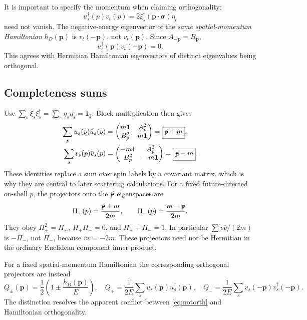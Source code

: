 \documentclass[11pt]{article}
\newcommand{\one}{\mathbf 1}
\begin{document}
It is important to specify the momentum when claiming orthogonality:
\begin{equation}
 u_s^\dagger(p)v_t(p)
    =2\xi_s^\dagger(\bm p\cdot\bm\sigma)\eta_t
 \label{eq:notorth}
\end{equation}
need not vanish. The negative-energy eigenvector of the
\emph{same spatial-momentum Hamiltonian} \(h_D(\bm p)\) is
\(v_t(-\bm p)\), not \(v_t(\bm p)\). Since
\(A_{-\bm p}=B_{\bm p}\),
\begin{equation}
 u_s^\dagger(\bm p)v_t(-\bm p)=0.
 \label{eq:trueorth}
\end{equation}
This agrees with Hermitian Hamiltonian eigenvectors of distinct
eigenvalues being orthogonal.

\subsection{Completeness sums}
Use \(\sum_s\xi_s\xi_s^\dagger=\sum_s\eta_s\eta_s^\dagger=\one_2\).
Block multiplication then gives
\begin{align}
 \sum_su_s(p)\bar u_s(p)
  &=\begin{pmatrix}m\one&A_p^2\\B_p^2&m\one\end{pmatrix}
    =\boxed{\slashed p+m},\label{eq:usum}\\
 \sum_sv_s(p)\bar v_s(p)
  &=\begin{pmatrix}-m\one&A_p^2\\B_p^2&-m\one\end{pmatrix}
    =\boxed{\slashed p-m}.\label{eq:vsum}
\end{align}
These identities replace a sum over spin labels by a covariant
matrix, which is why they are central to later scattering calculations.
For a fixed future-directed on-shell \(p\), the projectors onto the
\(\slashed p\) eigenspaces are
\begin{equation}
 \Pi_+(p)=\frac{\slashed p+m}{2m},\qquad
 \Pi_-(p)=\frac{m-\slashed p}{2m}.
 \label{eq:slashprojectors}
\end{equation}
They obey \(\Pi_\pm^2=\Pi_\pm\), \(\Pi_+\Pi_-=0\), and
\(\Pi_++\Pi_-=1\). In particular \(\sum v\bar v/(2m)\) is
\(-\Pi_-\), not \(\Pi_-\), because \(\bar vv=-2m\).
These projectors need not be Hermitian in the ordinary Euclidean
component inner product.

For a fixed spatial-momentum Hamiltonian the corresponding orthogonal
projectors are instead
\begin{equation}
 Q_\pm(\bm p)=\frac12\left(1\pm\frac{h_D(\bm p)}{E}\right),
 \quad Q_+=\frac{1}{2E}\sum_su_s(\bm p)u_s^\dagger(\bm p),
 \quad Q_-=\frac{1}{2E}\sum_sv_s(-\bm p)v_s^\dagger(-\bm p).
 \label{eq:hamprojectors}
\end{equation}
The distinction resolves the apparent conflict between
\eqref{eq:notorth} and Hamiltonian orthogonality.
\end{document}
